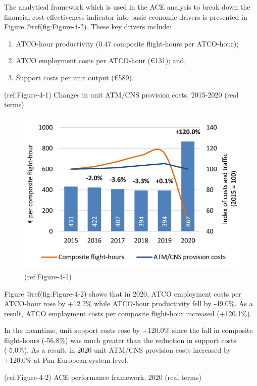 \documentclass[
]{book}
\providecommand{\tightlist}{%
  \setlength{\itemsep}{0pt}\setlength{\parskip}{0pt}}
\begin{document}
The analytical framework which is used in the ACE analysis to break down
the financial cost-effectiveness indicator into basic economic drivers
is presented in Figure @ref(fig:Figure-4-2). These key drivers include:

\begin{enumerate}
\def\labelenumi{\alph{enumi})}
\tightlist
\item
  ATCO-hour productivity (0.47 composite flight-hours per ATCO-hour);
\item
  ATCO employment costs per ATCO-hour (€131); and,
\item
  Support costs per unit output (€589).
\end{enumerate}

(ref:Figure-4-1) Changes in unit ATM/CNS provision costs, 2015-2020
(real terms)

\begin{figure}

{\centering \includegraphics[width=0.7\linewidth]{figures/Figure-4-1} 

}

\caption{(ref:Figure-4-1)}\label{fig:Figure-4-1}
\end{figure}

Figure @ref(fig:Figure-4-2) shows that in 2020, ATCO employment costs
per ATCO-hour rose by +12.2\% while ATCO-hour productivity fell by
-49.0\%. As a result, ATCO employment costs per composite flight-hour
increased (+120.1\%).

In the meantime, unit support costs rose by +120.0\% since the fall in
composite flight-hours (-56.8\%) was much greater than the reduction in
support costs (-5.0\%). As a result, in 2020 unit ATM/CNS provision
costs increased by +120.0\% at Pan-European system level.

(ref:Figure-4-2) ACE performance framework, 2020 (real terms)
\end{document}
